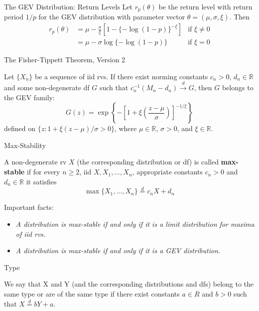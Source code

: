 \documentclass{beamer}
\begin{document}
\begin{frame}{The GEV Distribution: Return Levels}
    Let $r_p(\theta)$ be the return level with return period $1 / p$ for the GEV distribution with parameter vector $\theta = (\mu, \sigma, \xi)$. Then
    \begin{align*}
        r_p(\theta) &= \mu - \frac{\sigma}{\xi}[1 - \{-\log(1 - p)\}^{-\xi}] & \text{if $\xi \ne 0$} \\
        &= \mu - \sigma\log\{-\log(1 - p)\} & \text{if $\xi = 0$}
    \end{align*}
\end{frame}

\begin{frame}{The Fisher-Tippett Theorem, Version 2}
    \begin{theorem}
        Let $\{X_n\}$ be a sequence of iid rvs. If there exist norming constants $c_n > 0$, $d_n \in \mathbb{R}$ and some non-degenerate df $G$ such that $c_n^{-1}(M_n - d_n) \xrightarrow{d} G$, then $G$ belongs to the GEV family:
        \[
        G(z) = \exp\left\{-\left[1 + \xi\left(\frac{z - \mu}{\sigma}\right)\right]^{-1 / \xi}\right\}
        \]
        defined on $\{z : 1 + \xi(z - \mu) / \sigma > 0\}$, where $\mu \in \mathbb{R}$, $\sigma > 0$, and $\xi \in \mathbb{R}$.
    \end{theorem}
\end{frame}

\begin{frame}{Max-Stability}
    \begin{definition}
        A non-degenerate rv $X$ (the corresponding distribution or df) is called \textbf{max-stable} if for every $n \ge 2$, iid $X, X_1, \ldots, X_n$, appropriate constants $c_n > 0$ and $d_n \in \mathbb{R}$ it satisfies
        \[
        \max\{X_1, \ldots, X_n\} \overset{d}{=} c_n X + d_n
        \]
    \end{definition}
    Important facts:
    \begin{itemize}
        \item \textit{A distribution is max-stable if and only if it is a limit distribution for maxima of iid rvs.}
        \item \textit{A distribution is max-stable if and only if it is a GEV distribution.}
    \end{itemize}
\end{frame}

\begin{frame}{Type}
    \begin{definition}
        We say that X and Y (and the corresponding distributions and dfs) belong to the same type or are of the same type if there exist constants $a \in R$ and $b > 0$ such that $X \overset{d}{=} b Y + a$.
    \end{definition}
\end{frame}
\end{document}
